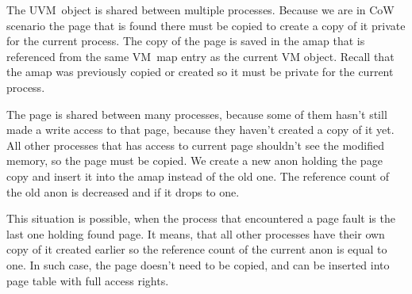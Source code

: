 \begin{description}[style=nextline]
  \item[Page in the UVM~object]
    The UVM~object is shared between multiple processes.
    Because we are in CoW scenario the page that is found there must be copied to create a copy of it private for the current process.
    The copy of the page is saved in the amap that is referenced from the same VM~map entry as the current VM object.
    Recall that the amap was previously copied or created so it must be private for the current process.

  \item[Page in the anon shared between multiple amaps]
    The page is shared between many processes, because some of them hasn't still made a write access to that page, because they haven't created a copy of it yet.
    All other processes that has access to current page shouldn't see the modified memory, so the page must be copied.
    We create a new anon holding the page copy and insert it into the amap instead of the old one.
    The reference count of the old anon is decreased and if it drops to one.

  \item[Page in the anon private for current amaps]
    This situation is possible, when the process that encountered a page fault is the last one holding found page.
    It means, that all other processes have their own copy of it created earlier so the reference count of the current anon is equal to one.
    In such case, the page doesn't need to be copied, and can be inserted into page table with full access rights.

\end{description}


